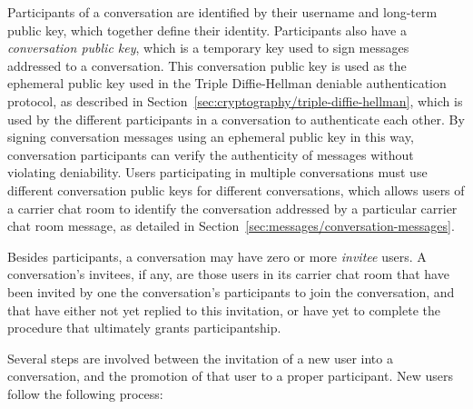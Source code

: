 \documentclass{article}
\begin{document}
Participants of a conversation are identified by their username and long-term public key, which together define their identity.
Participants also have a \emph{conversation public key}, which is a temporary key used to sign messages addressed to a conversation.
This conversation public key is used as the ephemeral public key used in the Triple Diffie-Hellman deniable authentication protocol, as described in Section~\ref{sec:cryptography/triple-diffie-hellman}, which is used by the different participants in a conversation to authenticate each other.
By signing conversation messages using an ephemeral public key in this way, conversation participants can verify the authenticity of messages without violating deniability.
Users participating in multiple conversations must use different conversation public keys for different conversations, which allows users of a carrier chat room to identify the conversation addressed by a particular carrier chat room message, as detailed in Section~\ref{sec:messages/conversation-messages}.

Besides participants, a conversation may have zero or more \emph{invitee} users.
A conversation's invitees, if any, are those users in its carrier chat room that have been invited by one the conversation's participants to join the conversation, and that have either not yet replied to this invitation, or have yet to complete the procedure that ultimately grants participantship.

Several steps are involved between the invitation of a new user into a conversation, and the promotion of that user to a proper participant.
New users follow the following process:
\end{document}
